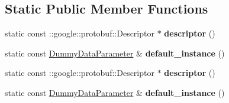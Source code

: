 \subsection*{Static Public Member Functions}
\begin{DoxyCompactItemize}
\item 
\mbox{\label{classcaffe_1_1_dummy_data_parameter_ae30f5e9e2a0f98667effe70783a03ad6}} 
static const \+::google\+::protobuf\+::\+Descriptor $\ast$ {\bfseries descriptor} ()
\item 
\mbox{\label{classcaffe_1_1_dummy_data_parameter_a8a85aa9a7af1e5135e32130dfe756d5c}} 
static const \mbox{\hyperlink{classcaffe_1_1_dummy_data_parameter}{Dummy\+Data\+Parameter}} \& {\bfseries default\+\_\+instance} ()
\item 
\mbox{\label{classcaffe_1_1_dummy_data_parameter_a89ba1e4b48ad1790f0e9bff4caf11027}} 
static const \+::google\+::protobuf\+::\+Descriptor $\ast$ {\bfseries descriptor} ()
\item 
\mbox{\label{classcaffe_1_1_dummy_data_parameter_a2fbe1ae8e56b0948ca9c5c278694d2ff}} 
static const \mbox{\hyperlink{classcaffe_1_1_dummy_data_parameter}{Dummy\+Data\+Parameter}} \& {\bfseries default\+\_\+instance} ()
\end{DoxyCompactItemize}
